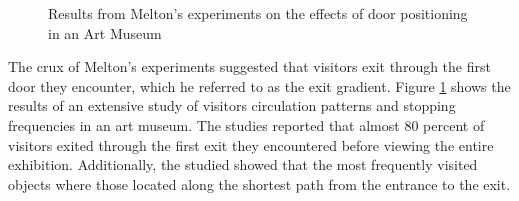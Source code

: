 \documentclass[12pt]{ucthesis}
\begin{document}
\begin{figure}[H]
 \centering
 \hspace{10 mm}
 \label{melton}
 \caption{Results from Melton's experiments on the effects of door positioning in an Art Museum}
\label{Melton-studies}
\end{figure}

The crux of Melton's experiments suggested that visitors exit through the first door they encounter, which he referred to as the exit gradient. Figure \ref{Melton-studies} shows the results of an extensive study of visitors circulation patterns and stopping frequencies in an art museum. The studies reported that almost 80 percent of visitors exited through the first exit they encountered before viewing the entire exhibition. Additionally, the studied showed that the most frequently visited objects where those located along the shortest path from the entrance to the exit. 

\end{document}
